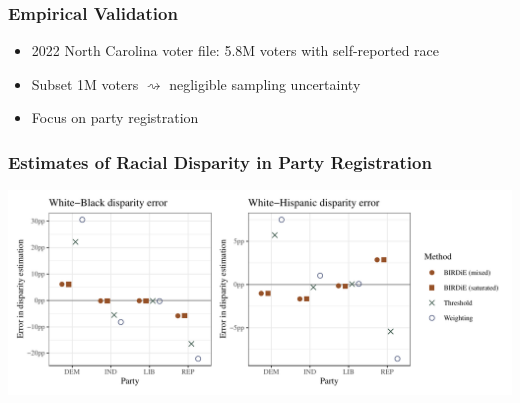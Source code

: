 \documentclass[handout]{beamer}
\begin{document}
\begin{frame}

  \frametitle{Empirical Validation}

  \begin{itemize}
  \item 2022 North Carolina voter file: 5.8M voters with
    self-reported race
  \item Subset 1M voters $\rightsquigarrow$ negligible sampling
    uncertainty

    \vfill
  \item Focus on party registration

  \end{itemize}

\end{frame}

\begin{frame}

  \frametitle{Estimates of Racial Disparity in Party Registration}

  \includegraphics[width=\textwidth]{../paper/figures/nc_disp.pdf}


\end{frame}
\end{document}
